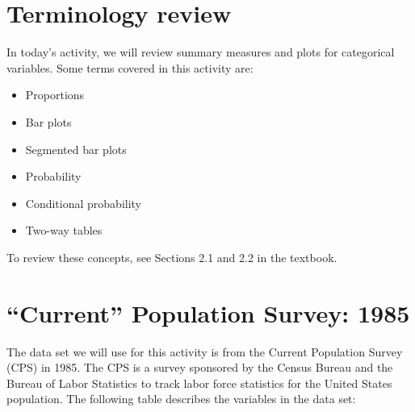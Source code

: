 \documentclass[
]{report}
\begin{document}
\hypertarget{terminology-review}{%
\section{Terminology review}\label{terminology-review}}

In today's activity, we will review summary measures and plots for categorical variables. Some terms covered in this activity are:

\begin{itemize}
\item
  Proportions
\item
  Bar plots
\item
  Segmented bar plots
\item
  Probability
\item
  Conditional probability
\item
  Two-way tables
\end{itemize}

To review these concepts, see Sections 2.1 and 2.2 in the textbook.

\newpage

\hypertarget{current-population-survey-1985}{%
\section{``Current'' Population Survey: 1985}\label{current-population-survey-1985}}

The data set we will use for this activity is from the Current Population Survey (CPS) in 1985. The CPS is a survey sponsored by the Census Bureau and the Bureau of Labor Statistics to track labor force statistics for the United States population. The following table describes the variables in the data set:
\end{document}
